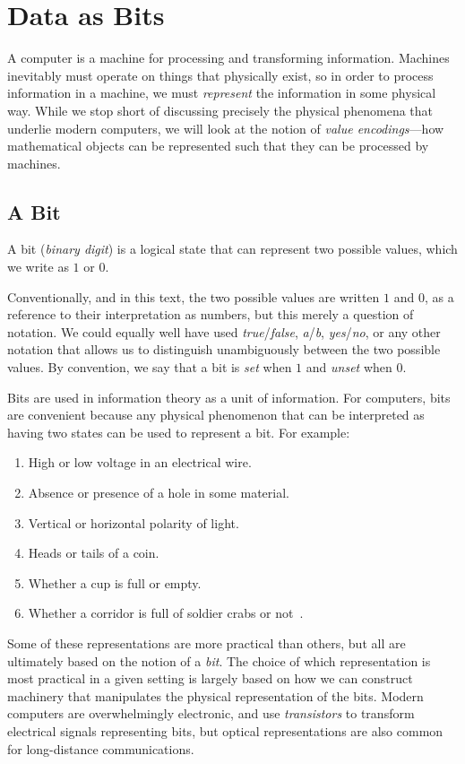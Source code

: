 \chapter{Data as Bits}
\label{chap:bits}

A computer is a machine for processing and transforming information.
Machines inevitably must operate on things that physically exist, so
in order to process information in a machine, we must \emph{represent}
the information in some physical way.  While we stop short of
discussing precisely the physical phenomena that underlie modern
computers, we will look at the notion of \emph{value encodings}---how
mathematical objects can be represented such that they can be
processed by machines.

\section{A Bit}
\label{sec:bit}

\begin{definition}[Bit]
  A bit (\emph{binary digit}) is a logical state that can represent two possible values,
  which we write as $1$ or $0$.
\end{definition}

Conventionally, and in this text, the two possible values are written
$1$ and $0$, as a reference to their interpretation as numbers, but
this merely a question of notation.  We could equally well have used
\emph{true}/\emph{false}, \emph{a}/\emph{b}, \emph{yes}/\emph{no}, or
any other notation that allows us to distinguish unambiguously between the
two possible values.  By convention, we say that a bit is \emph{set}
when $1$ and \emph{unset} when $0$.

Bits are used in information theory as a unit of information.  For
computers, bits are convenient because any physical phenomenon that
can be interpreted as having two states can be used to represent a
bit.  For example:
\begin{enumerate}
\item High or low voltage in an electrical wire.
\item Absence or presence of a hole in some material.
\item Vertical or horizontal polarity of light.
\item Heads or tails of a coin.
\item Whether a cup is full or empty.
\item Whether a corridor is full of soldier crabs or
  not~\cite{gunji2011robust}.
\end{enumerate}
Some of these representations are more practical than others, but all
are ultimately based on the notion of a \emph{bit}.  The choice of
which representation is most practical in a given setting is largely
based on how we can construct machinery that manipulates the physical
representation of the bits.  Modern computers are overwhelmingly
electronic, and use \emph{transistors} to transform electrical signals
representing bits, but optical representations are also common for
long-distance communications.

